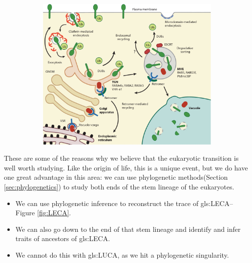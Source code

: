 \documentclass[]{article}
\begin{document}
\begin{figure}[H]
\begin{subfigure}[b]{0.45\textwidth}
	\end{subfigure}
	\begin{subfigure}[b]{0.45\textwidth}
	\includegraphics[width=\textwidth]{Regulation2}
	\end{subfigure}
\end{figure}

These are some of the reasons why we believe that the eukaryotic transition is well worth studying. Like the origin of life, this is a unique event, but we do have one great advantage in this area:  we can use phylogenetic methods(Section \ref{sec:phylogenetics}) to study both ends of the stem lineage of the eukaryotes.


\begin{itemize}
	\item We can use phylogenetic inference  to reconstruct the trace of \gls{gls:LECA}--Figure \ref {fig:LECA}.
	
	\item We can also go down to the end of that stem lineage and identify and infer traits of ancestors of \gls{gls:LECA}.
	
	\item  We cannot do this with \gls{gls:LUCA}, as we hit a phylogenetic singularity.

\end{itemize}
\end{document}
